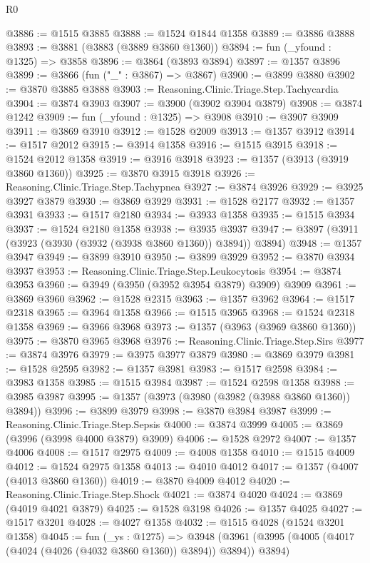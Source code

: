 \begin{lexlean}{R0}
\begin{coremodule}
@3886 := @1515 @3885
@3888 := @1524 @1844 @1358
@3889 := @3886 @3888
@3893 := @3881 (@3883 (@3889 @3860 @1360))
@3894 := fun (_yfound : @1325) => @3858
@3896 := @3864 (@3893 @3894)
@3897 := @1357 @3896
@3899 := @3866 (fun ("_" : @3867) => @3867)
@3900 := @3899 @3880
@3902 := @3870 @3885 @3888
@3903 := Reasoning.Clinic.Triage.Step.Tachycardia
@3904 := @3874 @3903
@3907 := @3900 (@3902 @3904 @3879)
@3908 := @3874 @1242
@3909 := fun (_yfound : @1325) => @3908
@3910 := @3907 @3909
@3911 := @3869 @3910
@3912 := @1528 @2009
@3913 := @1357 @3912
@3914 := @1517 @2012
@3915 := @3914 @1358
@3916 := @1515 @3915
@3918 := @1524 @2012 @1358
@3919 := @3916 @3918
@3923 := @1357 (@3913 (@3919 @3860 @1360))
@3925 := @3870 @3915 @3918
@3926 := Reasoning.Clinic.Triage.Step.Tachypnea
@3927 := @3874 @3926
@3929 := @3925 @3927 @3879
@3930 := @3869 @3929
@3931 := @1528 @2177
@3932 := @1357 @3931
@3933 := @1517 @2180
@3934 := @3933 @1358
@3935 := @1515 @3934
@3937 := @1524 @2180 @1358
@3938 := @3935 @3937
@3947 := @3897 (@3911 (@3923 (@3930 (@3932 (@3938 @3860 @1360)) @3894)) @3894)
@3948 := @1357 @3947
@3949 := @3899 @3910
@3950 := @3899 @3929
@3952 := @3870 @3934 @3937
@3953 := Reasoning.Clinic.Triage.Step.Leukocytosis
@3954 := @3874 @3953
@3960 := @3949 (@3950 (@3952 @3954 @3879) @3909) @3909
@3961 := @3869 @3960
@3962 := @1528 @2315
@3963 := @1357 @3962
@3964 := @1517 @2318
@3965 := @3964 @1358
@3966 := @1515 @3965
@3968 := @1524 @2318 @1358
@3969 := @3966 @3968
@3973 := @1357 (@3963 (@3969 @3860 @1360))
@3975 := @3870 @3965 @3968
@3976 := Reasoning.Clinic.Triage.Step.Sirs
@3977 := @3874 @3976
@3979 := @3975 @3977 @3879
@3980 := @3869 @3979
@3981 := @1528 @2595
@3982 := @1357 @3981
@3983 := @1517 @2598
@3984 := @3983 @1358
@3985 := @1515 @3984
@3987 := @1524 @2598 @1358
@3988 := @3985 @3987
@3995 := @1357 (@3973 (@3980 (@3982 (@3988 @3860 @1360)) @3894))
@3996 := @3899 @3979
@3998 := @3870 @3984 @3987
@3999 := Reasoning.Clinic.Triage.Step.Sepsis
@4000 := @3874 @3999
@4005 := @3869 (@3996 (@3998 @4000 @3879) @3909)
@4006 := @1528 @2972
@4007 := @1357 @4006
@4008 := @1517 @2975
@4009 := @4008 @1358
@4010 := @1515 @4009
@4012 := @1524 @2975 @1358
@4013 := @4010 @4012
@4017 := @1357 (@4007 (@4013 @3860 @1360))
@4019 := @3870 @4009 @4012
@4020 := Reasoning.Clinic.Triage.Step.Shock
@4021 := @3874 @4020
@4024 := @3869 (@4019 @4021 @3879)
@4025 := @1528 @3198
@4026 := @1357 @4025
@4027 := @1517 @3201
@4028 := @4027 @1358
@4032 := @1515 @4028 (@1524 @3201 @1358)
@4045 := fun (_ys : @1275) =>
  @3948 (@3961 (@3995 (@4005 (@4017 (@4024 (@4026 (@4032 @3860 @1360)) @3894)) @3894)) @3894)

\end{coremodule}
\end{lexlean}
